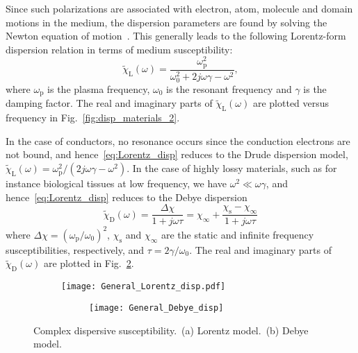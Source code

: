 \documentclass[journal]{IEEEtran}
\begin{document}
Since such polarizations are associated with electron, atom, molecule and domain motions in the medium, the dispersion parameters are found by solving the Newton equation of motion~\cite{Bladel_electromagnetic, Bladel_electromagnetics, Ishimaru_EM_Radia_Propag_Book1991, Jackson_Classical_Electd2012}. This generally leads to the following Lorentz-form dispersion relation in terms of medium susceptibility:
%
\begin{equation}\label{eq:Lorentz_disp}
  \tilde{\chi}_\textrm{L}(\omega)=\frac{\omega_\textrm{p}^2}{\omega_\textrm{0}^2+2j\omega\gamma-\omega^2},
\end{equation}
%
where $\omega_\text{p}$ is the plasma frequency, $\omega_0$ is the resonant frequency and $\gamma$ is the damping factor. The real and imaginary parts of $\tilde{\chi}_\textrm{L}(\omega)$ are plotted versus frequency in Fig.~\ref{fig:disp_materials_2}.

In the case of conductors, no resonance occurs since the conduction electrons are not bound, and hence~\eqref{eq:Lorentz_disp} reduces to the Drude dispersion model, $\tilde{\chi}_\textrm{L}(\omega)=\omega_\textrm{p}^2/(2j\omega\gamma-\omega^2)$. In the case of highly lossy materials, such as for instance biological tissues at low frequency, we have $\omega^2\ll\omega\gamma$, and hence~\eqref{eq:Lorentz_disp} reduces to the Debye dispersion
%
\begin{equation}\label{eq:Debye_disp}
\tilde{\chi}_\textrm{D}(\omega)
=\frac{\Delta \chi}{1+j\omega\tau}
=\chi_\infty+\frac{\chi_\textrm{s}-\chi_\infty}{1+j\omega\tau}
\end{equation}
%
where $\Delta\chi=(\omega_\text{p}/\omega_0)^2$, $\chi_\textrm{s}$ and $\chi_\infty$ are the static and infinite frequency susceptibilities, respectively, and $\tau=2\gamma/\omega_0$. The real and imaginary parts of $\tilde{\chi}_\textrm{D}(\omega)$ are plotted in Fig.~\ref{fig:disp_materials_1}.

\begin{figure}[!ht]
\centering
\begin{subfigure}{1\columnwidth}
  \centering
  \texttt{[image: General\_Lorentz\_disp.pdf]}
 \caption{}\label{fig:disp_materials_2}

\begin{subfigure}{1\columnwidth}
  \centering
  \texttt{[image: General\_Debye\_disp]}
\caption{}\label{fig:disp_materials_1}
\end{subfigure}
\end{subfigure}
\caption{Complex dispersive susceptibility.~(a) Lorentz model.~(b) Debye model.}
\label{fig:disp_materials}
\end{figure}
\end{document}
